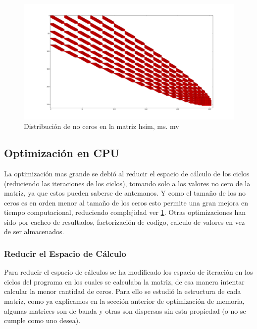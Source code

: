 \documentclass[a4paper,openright,12pt, oneside]{book}
\begin{document}
\begin{figure}[!htbp]
  \begin{center}
    \leavevmode

    \includegraphics[scale=0.3]{mat1.png}

    \caption{Distribuci\'on de no ceros en la matriz hsim, ms. mv}
    \label{img:matstyle}
  \end{center}
\end{figure}

\subsection{Optimizaci\'on en CPU}
La optimizaci\'on mas grande se debi\'o al reducir el espacio de c\'alculo de los ciclos (reduciendo las iteraciones de los ciclos), tomando solo a los valores no cero de la matriz, ya que estos pueden saberse de antemanos. 
Y como el tama\~no de los no ceros es en orden menor al tama\~no de los ceros esto permite una gran mejora en tiempo computacional, reduciendo complejidad ver \ref{img:matstyle}.
Otras optimizaciones han sido por cacheo de resultados, factorizaci\'on de codigo, calculo de valores en vez de ser almacenados.

\subsubsection{Reducir el Espacio de C\'alculo}

Para reducir el espacio de c\'alculos se ha modificado los espacio de iteraci\'on en los ciclos del programa en los cuales se calculaba la matriz, de esa manera intentar calcular la menor cantidad de ceros. Para ello se estudi\'o la estructura de cada matriz, como ya explicamos en la secci\'on anterior de optimizaci\'on de memoria, algunas matrices son de banda y otras son dispersas sin esta propiedad (o no se cumple como uno desea).
\end{document}
